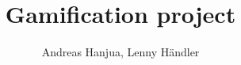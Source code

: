 \documentclass[a4paper,12pt]{book}
\begin{document}
\author{Andreas Hanjua, Lenny Händler}
\title{Gamification project}


\frontmatter
\maketitle
\tableofcontents

\mainmatter



\backmatter
\end{document}
